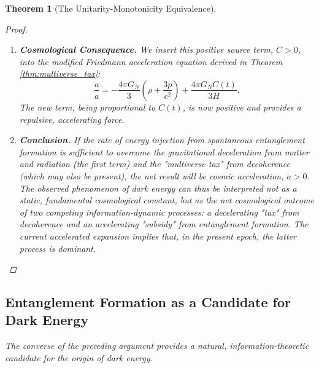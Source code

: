 \documentclass[11pt, letterpaper]{report}
\theoremstyle{plain} %
\newtheorem{theorem}{Theorem}[chapter]
\theoremstyle{definition} %
\theoremstyle{remark} %
\begin{document}
\begin{theorem}[The Unitarity-Monotonicity Equivalence]
\begin{proof}
\begin{enumerate}
    \item \textbf{Cosmological Consequence.} We insert this positive source term, $C > 0$, into the modified Friedmann acceleration equation derived in Theorem \ref{thm:multiverse_tax}:
    \begin{equation}
        \frac{\ddot{a}}{a} = -\frac{4\pi G_N}{3}\left(\rho + \frac{3p}{c^2}\right) + \frac{4\pi G_N C(t)}{3H}.
    \end{equation}
    The new term, being proportional to $C(t)$, is now positive and provides a repulsive, accelerating force.

    \item \textbf{Conclusion.} If the rate of energy injection from spontaneous entanglement formation is sufficient to overcome the gravitational deceleration from matter and radiation (the first term) and the "multiverse tax" from decoherence (which may also be present), the net result will be cosmic acceleration, $\ddot{a} > 0$. The observed phenomenon of dark energy can thus be interpreted not as a static, fundamental cosmological constant, but as the net cosmological outcome of two competing information-dynamic processes: a decelerating "tax" from decoherence and an accelerating "subsidy" from entanglement formation. The current accelerated expansion implies that, in the present epoch, the latter process is dominant.
\end{enumerate}
\end{proof}

\subsection{Entanglement Formation as a Candidate for Dark Energy}
\label{subsec:explore_dark_energy}

The converse of the preceding argument provides a natural, information-theoretic candidate for the origin of dark energy.


\end{theorem}
\end{document}
